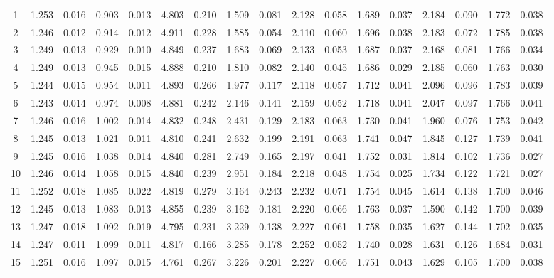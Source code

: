 \documentclass{article}
\begin{document}
\begin{table}[H]
{\begin{tabular}{|c|c|c|c|c|c|c|c|c|c|c|c|c|c|c|c|c|}
     1 & 1.253 & 0.016 & 0.903 & 0.013 & 4.803 & 0.210 & 1.509 & 0.081 & 2.128 & 0.058 & 1.689 & 0.037 & 2.184 & 0.090 & 1.772 & 0.038 \\ 
     2 & 1.246 & 0.012 & 0.914 & 0.012 & 4.911 & 0.228 & 1.585 & 0.054 & 2.110 & 0.060 & 1.696 & 0.038 & 2.183 & 0.072 & 1.785 & 0.038 \\ 
     3 & 1.249 & 0.013 & 0.929 & 0.010 & 4.849 & 0.237 & 1.683 & 0.069 & 2.133 & 0.053 & 1.687 & 0.037 & 2.168 & 0.081 & 1.766 & 0.034 \\ 
     4 & 1.249 & 0.013 & 0.945 & 0.015 & 4.888 & 0.210 & 1.810 & 0.082 & 2.140 & 0.045 & 1.686 & 0.029 & 2.185 & 0.060 & 1.763 & 0.030 \\ 
     5 & 1.244 & 0.015 & 0.954 & 0.011 & 4.893 & 0.266 & 1.977 & 0.117 & 2.118 & 0.057 & 1.712 & 0.041 & 2.096 & 0.096 & 1.783 & 0.039 \\ 
     6 & 1.243 & 0.014 & 0.974 & 0.008 & 4.881 & 0.242 & 2.146 & 0.141 & 2.159 & 0.052 & 1.718 & 0.041 & 2.047 & 0.097 & 1.766 & 0.041 \\ 
     7 & 1.246 & 0.016 & 1.002 & 0.014 & 4.832 & 0.248 & 2.431 & 0.129 & 2.183 & 0.063 & 1.730 & 0.041 & 1.960 & 0.076 & 1.753 & 0.042 \\ 
     8 & 1.245 & 0.013 & 1.021 & 0.011 & 4.810 & 0.241 & 2.632 & 0.199 & 2.191 & 0.063 & 1.741 & 0.047 & 1.845 & 0.127 & 1.739 & 0.041 \\ 
     9 & 1.245 & 0.016 & 1.038 & 0.014 & 4.840 & 0.281 & 2.749 & 0.165 & 2.197 & 0.041 & 1.752 & 0.031 & 1.814 & 0.102 & 1.736 & 0.027 \\ 
    10 & 1.246 & 0.014 & 1.058 & 0.015 & 4.840 & 0.239 & 2.951 & 0.184 & 2.218 & 0.048 & 1.754 & 0.025 & 1.734 & 0.122 & 1.721 & 0.027 \\ 
    11 & 1.252 & 0.018 & 1.085 & 0.022 & 4.819 & 0.279 & 3.164 & 0.243 & 2.232 & 0.071 & 1.754 & 0.045 & 1.614 & 0.138 & 1.700 & 0.046 \\ 
    12 & 1.245 & 0.013 & 1.083 & 0.013 & 4.855 & 0.239 & 3.162 & 0.181 & 2.220 & 0.066 & 1.763 & 0.037 & 1.590 & 0.142 & 1.700 & 0.039 \\ 
    13 & 1.247 & 0.018 & 1.092 & 0.019 & 4.795 & 0.231 & 3.229 & 0.138 & 2.227 & 0.061 & 1.758 & 0.035 & 1.627 & 0.144 & 1.702 & 0.035 \\ 
    14 & 1.247 & 0.011 & 1.099 & 0.011 & 4.817 & 0.166 & 3.285 & 0.178 & 2.252 & 0.052 & 1.740 & 0.028 & 1.631 & 0.126 & 1.684 & 0.031 \\ 
    15 & 1.251 & 0.016 & 1.097 & 0.015 & 4.761 & 0.267 & 3.226 & 0.201 & 2.227 & 0.066 & 1.751 & 0.043 & 1.629 & 0.105 & 1.700 & 0.038 \\ 

\end{tabular}}
\end{table}
\end{document}
